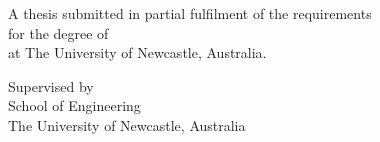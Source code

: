% 

\begin{titlepage}
  \thispagestyle{empty}
  \centering

  {\LARGE\bfseries \reportTitle \par}

  \vspace{40mm}

  {\large \reportAuthor \par}

  \vspace{10mm}

  {\normalsize
    A thesis submitted in partial fulfilment of the requirements\\
    for the degree of \reportDegree\\
    at The University of Newcastle, Australia.
  \par}

  \vfill

  {\normalsize
    Supervised by \supervisorName\\[6pt]
    School of Engineering\\
    The University of Newcastle, Australia\\[6pt]
    \reportYear
  \par}
\end{titlepage}
\restoregeometry    %

\setcounter{page}{1}




